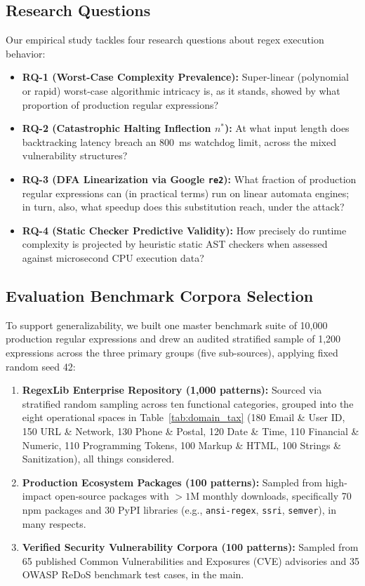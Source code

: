 \documentclass{ieeeaccess}
\begin{document}
\subsection{Research Questions}
Our empirical study tackles four research questions about regex execution behavior:
\begin{itemize}
    \item \textbf{RQ-1 (Worst-Case Complexity Prevalence):} Super-linear (polynomial or rapid) worst-case algorithmic intricacy is, as it stands, showed by what proportion of production regular expressions?
    \item \textbf{RQ-2 (Catastrophic Halting Inflection $n^*$):} At what input length does backtracking latency breach an 800~ms watchdog limit, across the mixed vulnerability structures?
    \item \textbf{RQ-3 (DFA Linearization via Google \texttt{re2}):} What fraction of production regular expressions can (in practical terms) run on linear automata engines; in turn, also, what speedup does this substitution reach, under the attack?
    \item \textbf{RQ-4 (Static Checker Predictive Validity):} How precisely do runtime complexity is projected by heuristic static AST checkers when assessed against microsecond CPU execution data?
\end{itemize}

\subsection{Evaluation Benchmark Corpora Selection}
To support generalizability, we built one master benchmark suite of 10,000 production regular expressions and drew an audited stratified sample of 1,200 expressions across the three primary groups (five sub-sources), applying fixed random seed 42:
\begin{enumerate}
    \item \textbf{RegexLib Enterprise Repository (1,000 patterns):} Sourced via stratified random sampling across ten functional categories, grouped into the eight operational spaces in Table~\ref{tab:domain_tax} (180 Email \& User ID, 150 URL \& Network, 130 Phone \& Postal, 120 Date \& Time, 110 Financial \& Numeric, 110 Programming Tokens, 100 Markup \& HTML, 100 Strings \& Sanitization), all things considered.
    \item \textbf{Production Ecosystem Packages (100 patterns):} Sampled from high-impact open-source packages with $>1$M monthly downloads, specifically 70 npm packages and 30 PyPI libraries (e.g., \texttt{ansi-regex}, \texttt{ssri}, \texttt{semver}), in many respects.
    \item \textbf{Verified Security Vulnerability Corpora (100 patterns):} Sampled from 65 published Common Vulnerabilities and Exposures (CVE) advisories and 35 OWASP ReDoS benchmark test cases, in the main.
\end{enumerate}
\end{document}
